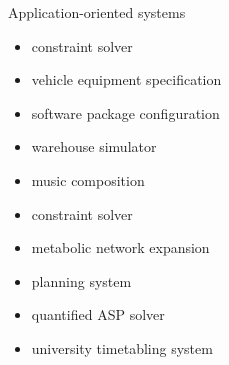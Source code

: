 \newcommand{\purpose}[1]{\hfill #1}
\begin{frame}{Application-oriented systems}
  \begin{itemize}
  \item \aspartame\purpose{constraint solver}
  \item \aspcafe\purpose{vehicle equipment specification}
  \item \aspcud\purpose{software package configuration}
  \item \asprilo\purpose{warehouse simulator}
  \item \chasp\purpose{music composition}
  \item \flatzingo\purpose{constraint solver}
  \item \fluto\purpose{metabolic network expansion}
  \item \plasp\purpose{planning system}
  \item \qasp\purpose{quantified ASP solver}
  \item \teaspoon\purpose{university timetabling system}
  \end{itemize}
\end{frame}
%
